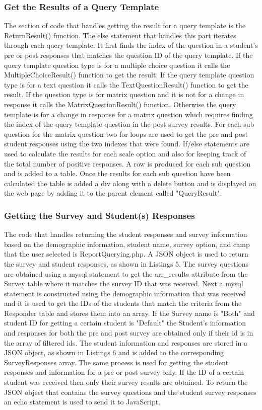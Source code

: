 \documentclass[../final.tex]{subfiles}
\begin{document}
	\subsubsection{Get the Results of a Query Template}
	The section of code that handles getting the result for a query template  is the ReturnResult() function. The else statement that handles this part iterates through each query template. It first finds the index of the question in a student's pre or post responses that matches the question ID of the query template. If the query template question type is for a multiple choice question it calls the MultipleChoiceResult() function to get the result. If the query template question type is for a text question it calls the TextQuestionResult() function to get the result. If the question type is for matrix question and it is not for a change in response it calls the MatrixQuestionResult() function. Otherwise the query template is for a change in response for a matrix question which requires finding the index of the query template question in the post survey results. For each sub question for the matrix question two for loops are used to get the pre and post student responses using the two indexes that were found. If/else statements are used to calculate the results for each scale option and also for keeping track of the total number of positive responses. A row is produced for each sub question and is added to a table. Once the results for each sub question have been calculated the table is added a div along with a delete button and is displayed on the web page by adding it to the parent element called "QueryResult". 
	
	
	\subsubsection{Getting the Survey and Student(s) Responses}
	The code that handles returning the student responses and survey information based on the demographic information, student name, survey option, and camp that the user selected is ReportQuerying.php. A JSON object is used to return the survey and student responses, as shown in Listings 5. The survey questions are obtained using a mysql statement to get the arr\_results attribute from the Survey table where it matches the survey ID that was received. Next a mysql statement is constructed using the demographic information that was received and it is used to get the IDs of the students that match the criteria from the Responder table and stores them into an array. If the Survey name is "Both" and student ID for getting a certain student is "Default" the Student's information and responses for both the pre and post survey are obtained only if their id is in the array of filtered ids. The student information and responses are stored in a JSON object, as shown in Listings 6 and is added to the corresponding SurveyResponses array. The same process is used for getting the student responses and information for a pre or post survey only. If the ID of a certain student was received then only their survey results are obtained. To return the JSON object that contains the survey questions and the student survey responses an echo statement is used to send it to JavaScript. 
	
\end{document}
